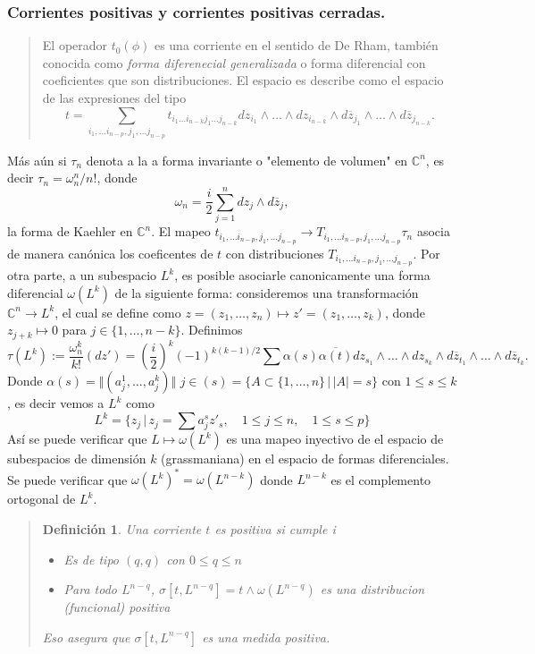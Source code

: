 \documentclass[letterpaper]{article}
\newtheorem{def.}{Definici\'on}[section]
\newcommand{\con}{\ensuremath{\mathbb{C}^n}}
\begin{document}
\subsubsection{Corrientes positivas y corrientes positivas cerradas.}
\label{sec:org61c3412}
\begin{quote}
El operador \(t_0(\phi)\) es una corriente en el sentido de De Rham, también conocida como \emph{forma diferenecial generalizada} o forma diferencial con coeficientes que son distribuciones. El espacio es describe como el espacio de las expresiones del tipo
\[
    t=\sum_{i_1,\dots i_{n-p},j_1,\dots j_{n-p}}t_{i_1\dots i_{n-k}j_1\dots j_{n-k}} dz_{i_1}\wedge\dots\wedge dz_{i_{n-k}}\wedge d\overline{z}_{j_1}\wedge\dots\wedge d\overline{z}_{j_{n-k}}.
\]
\end{quote}
Más aún si \(\tau_n\) denota a la a forma invariante o "elemento de volumen" en \(\con\), es decir \(\tau_n=\omega_n^n/n!\), donde
\[
    \omega_n=\frac{i}{2}\sum_{j=1}^n dz_j\wedge d\overline{z}_j,
\]
la forma de Kaehler en \(\con\). El mapeo \(t_{i_1,\dots i_{n-p},j_1,\dots j_{n-p}}\rightarrow T_{i_1,\dots i_{n-p},j_1,\dots j_{n-p}}\tau_n\) asocia de manera canónica los coeficentes de \(t\) con distribuciones \(T_{i_1,\dots i_{n-p},j_1,\dots j_{n-p}}\). Por otra parte, a un subespacio \(L^k\), es posible asociarle canonicamente una forma diferencial \(\omega(L^k)\) de la siguiente forma: consideremos una transformación \(\con\rightarrow L^k\), el cual se define como \(z=(z_1,\dots,z_n)\mapsto z'=(z_1,\dots,z_k)\), donde \(z_{j+k}\mapsto 0\) para \(j\in\{1,\dots,n-k\}\). Definimos
\[
    \tau(L^k):=\frac{\omega_n^k}{k!}(dz')=(\frac{i}{2})^k(-1)^{k(k-1)/2}\sum \alpha(s)\overline{\alpha(t)}dz_{s_1}\wedge\dots\wedge dz_{s_k}\wedge d\overline{z}_{t_1}\wedge \dots\wedge d\overline{z}_{t_k}.
\]
Donde \(\alpha(s)=\Vert(a^{1}_{j},\dots,a^{k}_{j})\Vert\) \(j\in(s)=\{A\subset\{1,\dots,n\}\,\vert\, |A|=s\}\) con \(1\leq s\leq k\), es decir vemos a \(L^k\) como
\[
    L^k=\{z_j\,\vert\,z_j=\sum a^{s}_{j}z'_s,\quad 1\leq j\leq n,\quad 1\leq s\leq p \}
\]
Así se puede verificar que \(L\mapsto\omega(L^k)\) es una mapeo inyectivo de el espacio de subespacios de dimensión \(k\) (grassmaniana) en el espacio de formas diferenciales. Se puede verificar que \(\omega(L^k)^{*}=\omega(L^{n-k})\) donde \(L^{n-k}\) es el complemento ortogonal de \(L^k\).
\begin{quote}
\begin{def.}
    Una corriente \(t\) es positiva si cumple
i    \begin{itemize}
        \item[a)] Es de tipo \((q,q)\) con \(0\leq q\leq n\)
        \item[b)] Para todo \(L^{n-q}\), \(\sigma[t,L^{n-q}]=t\wedge\omega(L^{n-q})\) es una distribucion (funcional) positiva
    \end{itemize}
    Eso asegura que \(\sigma[t,L^{n-q}]\) es una medida positiva.
\end{def.}
\end{quote}
\end{document}
